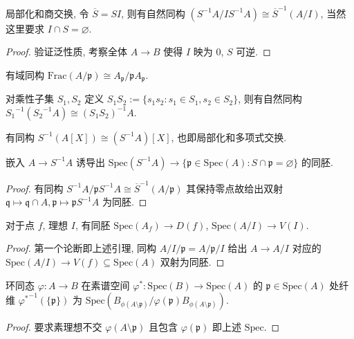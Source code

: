 \begin{lemma}
    局部化和商交换, 令 \(\overline{S} = S I\), 则有自然同构 \((S^{-1} A / I S^{-1} A) \cong \overline{S}^{-1} (A / I)\),
    当然这里要求 \(I \cap S = \varnothing\).

    \begin{proof}
        验证泛性质, 考察全体 \(A \to B\) 使得 \(I\) 映为 \(0\), \(S\) 可逆.
    \end{proof}
\end{lemma}

\begin{corollary}
    有域同构 \(\mathrm{Frac} (A / \mathfrak{p}) \cong A_{\mathfrak{p}} / \mathfrak{p} A_{\mathfrak{p}}\).
\end{corollary}

\begin{lemma}
    对乘性子集 \(S_1,S_2\) 定义 \(S_1 S_2 := \{s_1 s_2 : s_1 \in S_1, s_2 \in S_2\}\), 则有自然同构 \({S_1}^{-1} ({S_2}^{-1} A) \cong {(S_1 S_2)}^{-1} A\).
\end{lemma}

\begin{lemma}
    有同构 \(S^{-1} (A[X]) \cong (S^{-1} A)[X]\), 也即局部化和多项式交换.
\end{lemma}

\begin{lemma}
    嵌入 \(A \to S^{-1} A\) 诱导出 \(\mathrm{Spec} (S^{-1} A) \to \{\mathfrak{p} \in \mathrm{Spec} (A) : S \cap \mathfrak{p} = \varnothing\}\) 的同胚.

    \begin{proof}
        有同构 \(S^{-1} A / \mathfrak{p} S^{-1} A \cong \overline{S}^{-1} (A / \mathfrak{p})\) 其保持零点故给出双射 \(\mathfrak{q} \mapsto \mathfrak{q} \cap A, \mathfrak{p} \mapsto \mathfrak{p} S^{-1} A\) 为同胚.
    \end{proof}
\end{lemma}

\begin{lemma}
    对于点 \(f\), 理想 \(I\), 有同胚 \(\mathrm{Spec} (A_f) \to D(f)\), \(\mathrm{Spec} (A / I) \to V(I)\).

    \begin{proof}
        第一个论断即上述引理, 同构 \(A/I/\mathfrak{p} = A/\mathfrak{p}/I\) 给出 \(A \to A/I\) 对应的 \(\mathrm{Spec} (A/I) \to V(f) \subseteq \mathrm{Spec} (A)\) 双射为同胚.
    \end{proof}
\end{lemma}

\begin{lemma}
    环同态 \(\varphi : A \to B\) 在素谱空间 \(\varphi^\ast : \mathrm{Spec} (B) \to \mathrm{Spec} (A)\) 的 \(\mathfrak{p} \in \mathrm{Spec} (A)\) 处纤维 \({\varphi^{\ast}}^{-1} (\{\mathfrak{p}\})\) 为 \(\mathrm{Spec} (B_{\phi(A \setminus \mathfrak{p})}/\varphi(\mathfrak{p}) B_{\phi(A \setminus \mathfrak{p})})\).

    \begin{proof}
        要求素理想不交 \(\varphi(A \setminus \mathfrak{p})\) 且包含 \(\varphi(\mathfrak{p})\) 即上述 \(\mathrm{Spec}\).
    \end{proof}
\end{lemma}

